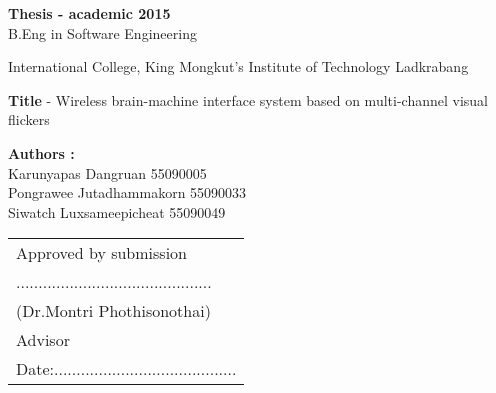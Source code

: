 \begin{approve}
\textbf{Thesis - academic 2015}\\
B.Eng in Software Engineering

International College, King Mongkut's Institute of Technology Ladkrabang


\textbf{Title} - Wireless brain-machine interface system based on multi-channel visual flickers

\textbf{Authors :}\\
Karunyapas  Dangruan  55090005\\
Pongrawee  Jutadhammakorn 55090033\\
Siwatch  Luxsameepicheat  55090049\\

\begin{flushright}
\begin{tabu}{ P}
	
	Approved by submission\\
	............................................\\
	(Dr.Montri Phothisonothai)\\
	Advisor\\
	
	Date:.........................................\\
\end{tabu}   
\end{flushright}




\end{approve}